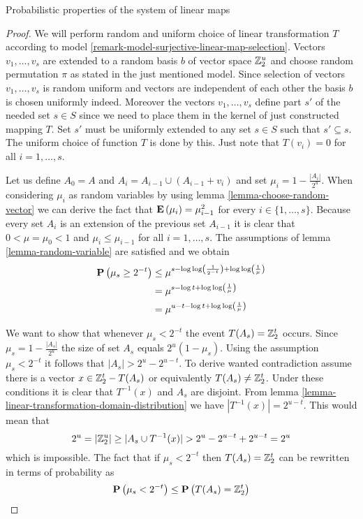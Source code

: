 \begin{section}{Probabilistic properties of the system of linear maps}
\begin{proof}
We will perform random and uniform choice of linear transformation $T$ according to model \ref{remark-model-surjective-linear-map-selection}. Vectors $v_1, \dots, v_s$ are extended to a random basis $b$ of vector space $\mathbb{Z}_{2}^{u}$ and choose random permutation $\pi$ as stated in the just mentioned model. Since selection of vectors $v_1, \dots, v_s$ is random uniform and vectors are independent of each other the basis $b$ is chosen uniformly indeed. Moreover the vectors $v_1, \dots, v_s$ define part $s'$ of the needed set $s \in S$ since we need to place them in the kernel of just constructed mapping $T$. Set $s'$ must be uniformly extended to any set $s \in S$ such that $s' \subseteq s$. The uniform choice of function $T$ is done by this. Just note that $T(v_i) = 0$ for all $i = 1, \dots, s$.	

Let us define $A_0 = A$ and $A_i = A_{i - 1} \cup (A_{i - 1} + v_i)$ and set $\mu_i = 1 - \frac{|A_i|}{2 ^ u}$. When considering $\mu_i$ as random variables by using lemma \ref{lemma-choose-random-vector} we can derive the fact that $\mathbf{E}\left(\mu_i\right) = \mu_{i - 1} ^ 2$ for every $i \in \{1, \dots, s \}$. Because every set $A_i$ is an extension of the previous set $A_{i - 1}$ it is clear that $0 < \mu = \mu_0 < 1$ and $\mu_i \leq \mu_{i - 1}$ for all $i = 1, \dots, s$. The assumptions of lemma \ref{lemma-random-variable} are satisfied and we obtain
\[
\begin{split}
\mathbf{P}\left(\mu_s \geq 2 ^ {-t}\right) 
	& \leq \mu ^ {s - \log \log \left(\frac{1}{2 ^ {-t}}\right) + \log \log \left( \frac{1}{\mu} \right)} \\
	& = \mu ^ {s - \log t + \log \log \left(\frac{1}{\mu}\right)} \\
	& = \mu ^ {u - t - \log t + \log \log \left(\frac{1}{\mu}\right)}
\end{split}
\]

We want to show that whenever $\mu_s < 2^{-t}$ the event $T(A_s) = \mathbb{Z}_{2}^{t}$ occurs. Since $\mu_s = 1 - \frac{|A_s|}{2 ^ u}$ the size of set $A_s$ equals ${2 ^ u}(1 - \mu_s)$. Using the assumption $\mu_s < 2 ^ {-t}$ it follows that $|A_s| > 2^u - 2^{u - t}$. To derive wanted contradiction assume there is a vector $x \in \mathbb{Z}_{2}^{t} - T(A_s)$ or equivalently $T(A_s) \neq \mathbb{Z}_{2}^{t}$. Under these conditions it is clear that $T ^ {-1}(x)$ and $A_s$ are disjoint. From lemma \ref{lemma-linear-transformation-domain-distribution} we have $|T ^ {-1}(x)| = 2 ^ {u - t}$. This would mean that
\[
2 ^ u = |\mathbb{Z}_{2}^{u}| \geq |A_s \cup T^{-1}(x)| > 2 ^ u - 2 ^ {u - t} + 2 ^ {u - t} = 2 ^u
\] which is impossible. The fact that if $\mu_s < 2^{-t}$ then $T(A_s) = \mathbb{Z}_{2}^{t}$ can be rewritten in terms of probability as
\[
	\mathbf{P}\left(\mu_s < 2^{-t}\right) \leq \mathbf{P}\left(T(A_s) = \mathbb{Z}_{2}^{t}\right)
\]


\end{proof}
\end{section}
